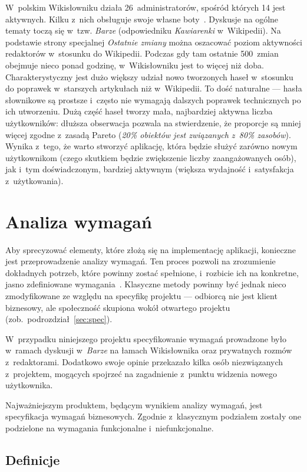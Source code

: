 W~polskim Wikisłowniku działa 26~administratorów, spośród których 14 jest aktywnych. Kilku z~nich obsługuje swoje własne boty~\cite{wikt:admin}. Dyskusje na ogólne tematy toczą się w~tzw. \emph{Barze} (odpowiedniku \emph{Kawiarenki} w~Wikipedii). Na podstawie strony specjalnej \emph{Ostatnie zmiany} można oszacować poziom aktywności redaktorów w~stosunku do Wikipedii. Podczas gdy tam ostatnie 500~zmian obejmuje nieco ponad godzinę, w~Wikisłowniku jest to więcej niż doba. Charakterystyczny jest dużo większy udział nowo tworzonych haseł w~stosunku do poprawek w~starszych artykułach niż w~Wikipedii. To dość naturalne --- hasła słownikowe są prostsze i~często nie wymagają dalszych poprawek technicznych po ich utworzeniu. Dużą część haseł tworzy mała, najbardziej aktywna liczba użytkowników: dłuższa obserwacja pozwala na stwierdzenie, że proporcje są mniej więcej zgodne z~zasadą Pareto (\emph{20\% obiektów jest związanych z~80\% zasobów}). Wynika z~tego, że warto stworzyć aplikację, która będzie służyć zarówno nowym użytkownikom (czego skutkiem będzie zwiększenie liczby zaangażowanych osób), jak i~tym doświadczonym, bardziej aktywnym (większa wydajność i~satysfakcja z~użytkowania).


\section{Analiza wymagań}
Aby sprecyzować elementy, które złożą się na implementację aplikacji, konieczne jest przeprowadzenie analizy wymagań. Ten proces pozwoli na zrozumienie dokładnych potrzeb, które powinny zostać spełnione, i~rozbicie ich na konkretne, jasno zdefiniowane wymagania~\cite{guidebook}. Klasyczne metody powinny być jednak nieco zmodyfikowane ze względu na specyfikę projektu --- odbiorcą nie jest klient biznesowy, ale społeczność skupiona wokół otwartego projektu (zob.~podrozdział~\ref{sec:spec}).

W~przypadku niniejszego projektu specyfikowanie wymagań prowadzone było w~ramach dyskusji w~\emph{Barze} na łamach Wikisłownika oraz prywatnych rozmów z~redaktorami. Dodatkowo swoje opinie przekazało kilka osób niezwiązanych z~projektem, mogących spojrzeć na zagadnienie z~punktu widzenia nowego użytkownika.

Najważniejszym produktem, będącym wynikiem analizy wymagań, jest specyfikacja wymagań biznesowych. Zgodnie z~klasycznym podziałem zostały one podzielone na wymagania funkcjonalne i~niefunkcjonalne.

\subsection{Definicje}

